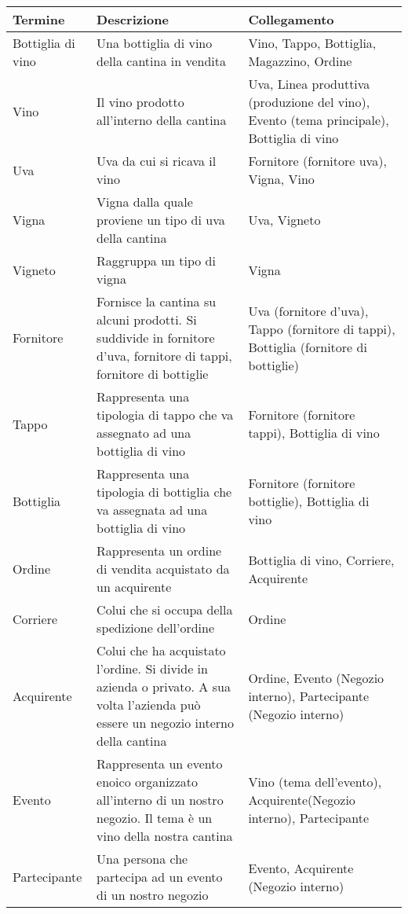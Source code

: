 \begin{center}
	\begin{tabular}{P{2cm}P{8cm}P{4cm}}
		\toprule
		 Termine & Descrizione & Collegamento \\
		\midrule
		Bottiglia di vino & Una bottiglia di vino della cantina in vendita & Vino, Tappo, Bottiglia, Magazzino, Ordine\\
		\midrule
		Vino & Il vino prodotto all'interno della cantina & Uva, Linea produttiva (produzione del vino), Evento (tema principale), Bottiglia di vino \\
		\midrule
		Uva & Uva da cui si ricava il vino &  Fornitore (fornitore uva), Vigna, Vino\\
		\midrule
		Vigna & Vigna dalla quale proviene un tipo di uva della cantina &  Uva, Vigneto\\
		\midrule
		Vigneto & Raggruppa un tipo di vigna &  Vigna\\
		\midrule
		Fornitore & Fornisce la cantina su alcuni prodotti. Si suddivide in fornitore d'uva, fornitore di tappi, fornitore di bottiglie &  Uva (fornitore d'uva), Tappo (fornitore di tappi), Bottiglia (fornitore di bottiglie)\\
		\midrule
		Tappo & Rappresenta una tipologia di tappo che va assegnato ad una bottiglia di vino &  Fornitore (fornitore tappi), Bottiglia di vino\\
		\midrule
		Bottiglia & Rappresenta una tipologia di bottiglia che va assegnata ad una bottiglia di vino &  Fornitore (fornitore bottiglie), Bottiglia di vino\\
		\midrule
		Ordine & Rappresenta un ordine di vendita acquistato da un acquirente &  Bottiglia di vino, Corriere, Acquirente\\
		\midrule
		Corriere & Colui che si occupa della spedizione dell'ordine &  Ordine\\
		\midrule
		Acquirente & Colui che ha acquistato l'ordine. Si divide in azienda o privato. A sua volta l'azienda può essere un negozio interno della cantina &  Ordine, Evento (Negozio interno), Partecipante (Negozio interno)\\
		\midrule
		Evento & Rappresenta un evento enoico organizzato all'interno di un nostro negozio. Il tema è un vino della nostra cantina  &  Vino (tema dell'evento), Acquirente(Negozio interno), Partecipante\\
		\midrule
		Partecipante & Una persona che partecipa ad un evento di un nostro negozio &  Evento, Acquirente (Negozio interno)\\

\end{tabular}
\end{center}
